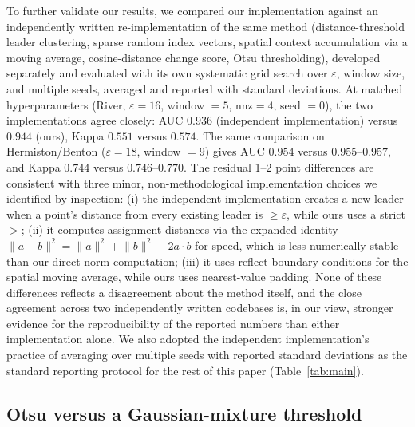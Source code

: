 \documentclass[11pt]{article}
\begin{document}
To further validate our results, we compared our implementation against an independently written re-implementation of the same method (distance-threshold leader clustering, sparse random index vectors, spatial context accumulation via a moving average, cosine-distance change score, Otsu thresholding), developed separately and evaluated with its own systematic grid search over $\varepsilon$, window size, and multiple seeds, averaged and reported with standard deviations. At matched hyperparameters (River, $\varepsilon=16$, window $=5$, $\mathrm{nnz}=4$, seed $=0$), the two implementations agree closely: AUC $0.936$ (independent implementation) versus $0.944$ (ours), Kappa $0.551$ versus $0.574$. The same comparison on Hermiston/Benton ($\varepsilon=18$, window $=9$) gives AUC $0.954$ versus $0.955$--$0.957$, and Kappa $0.744$ versus $0.746$--$0.770$. The residual 1--2 point differences are consistent with three minor, non-methodological implementation choices we identified by inspection: (i) the independent implementation creates a new leader when a point's distance from every existing leader is $\geq \varepsilon$, while ours uses a strict $>$; (ii) it computes assignment distances via the expanded identity $\lVert a-b\rVert^2 = \lVert a\rVert^2+\lVert b\rVert^2-2 a\cdot b$ for speed, which is less numerically stable than our direct norm computation; (iii) it uses reflect boundary conditions for the spatial moving average, while ours uses nearest-value padding. None of these differences reflects a disagreement about the method itself, and the close agreement across two independently written codebases is, in our view, stronger evidence for the reproducibility of the reported numbers than either implementation alone. We also adopted the independent implementation's practice of averaging over multiple seeds with reported standard deviations as the standard reporting protocol for the rest of this paper (Table~\ref{tab:main}).

\subsection{Otsu versus a Gaussian-mixture threshold}
\label{sec:otsu-vs-alternatives}
\end{document}

